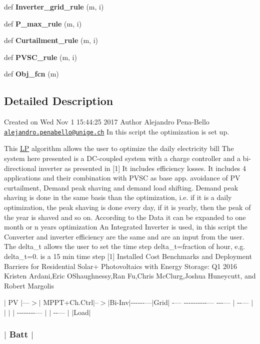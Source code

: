 \begin{DoxyCompactItemize}
def {\bfseries Inverter\+\_\+grid\+\_\+rule} (m, i)
\item 
\mbox{\label{namespace_l_p_a12fc2729e8471d6cd254664a9bd94390}} 
def {\bfseries P\+\_\+max\+\_\+rule} (m, i)
\item 
\mbox{\label{namespace_l_p_a785fe683f3e79df7f8a0234fd7bae5b7}} 
def {\bfseries Curtailment\+\_\+rule} (m, i)
\item 
\mbox{\label{namespace_l_p_acf9197fcddcdd5c3bd324a1227235ee2}} 
def {\bfseries P\+V\+S\+C\+\_\+rule} (m, i)
\item 
\mbox{\label{namespace_l_p_a073ca69e2d3f4650b19e9f703f0e3295}} 
def {\bfseries Obj\+\_\+fcn} (m)
\end{DoxyCompactItemize}


\subsection{Detailed Description}
Created on Wed Nov 1 15\+:44\+:25 2017 Author Alejandro Pena-\/\+Bello \href{mailto:alejandro.penabello@unige.ch}{\tt alejandro.\+penabello@unige.\+ch} In this script the optimization is set up. 

This \mbox{\hyperlink{namespace_l_p}{LP}} algorithm allows the user to optimize the daily electricity bill The system here presented is a D\+C-\/coupled system with a charge controller and a bi-\/directional inverter as presented in \mbox{[}1\mbox{]} It includes efficiency losses. It includes 4 applications and their combination with P\+V\+SC as base app. avoidance of PV curtailment, Demand peak shaving and demand load shifting. Demand peak shaving is done in the same basis than the optimization, i.\+e. if it is a daily optimization, the peak shaving is done every day, if it is yearly, then the peak of the year is shaved and so on. According to the Data it can be expanded to one month or n years optimization An Integrated Inverter is used, in this script the Converter and inverter efficiency are the same and are an input from the user. The delta\+\_\+t allows the user to set the time step delta\+\_\+t=fraction of hour, e.\+g. delta\+\_\+t=0. is a 15 min time step \mbox{[}1\mbox{]} Installed Cost Benchmarks and Deployment Barriers for Residential Solar+ Photovoltaics with Energy Storage\+: Q1 2016 Kristen Ardani,Eric O\textquotesingle{}Shaughnessy,Ran Fu,Chris Mc\+Clurg,Joshua Huneycutt, and Robert Margolis 

 $\vert$ PV $\vert$---$>$$\vert$ M\+P\+P\+T+\+Ch.Ctrl$\vert$--$>$$\vert$\+Bi-\/\+Inv$\vert$-\/-\/-\/-\/-\/-\/---$\vert$\+Grid$\vert$ -\/--- -\/-\/-\/-\/-\/-\/-\/-\/-\/-\/--- -\/-\/-\/--- $\vert$ -\/-\/--- $\vert$ $\vert$ $\vert$ $\vert$ -\/-\/-\/-\/-\/-\/-\/-\/--- $\vert$ $\vert$ -\/-\/--- $\vert$ $\vert$\+Load$\vert$ 

 \subsubsection*{$\vert$ Batt $\vert$ }